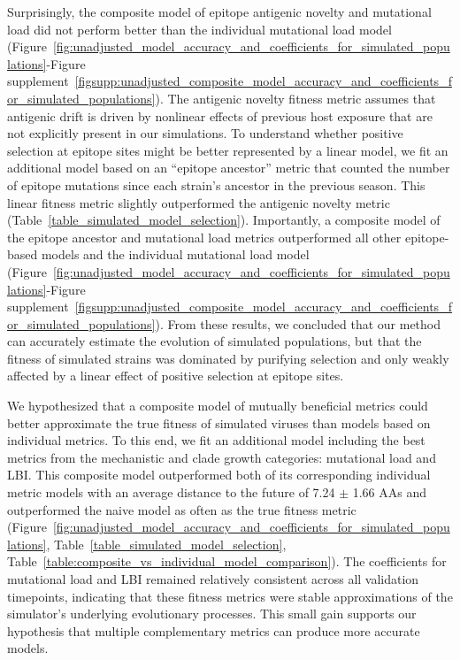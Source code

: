 Surprisingly, the composite model of epitope antigenic novelty and mutational load did not perform better than the individual mutational load model (Figure~\ref{fig:unadjusted_model_accuracy_and_coefficients_for_simulated_populations}-Figure supplement~\ref{figsupp:unadjusted_composite_model_accuracy_and_coefficients_for_simulated_populations}).
The antigenic novelty fitness metric assumes that antigenic drift is driven by nonlinear effects of previous host exposure \citep{Luksza:2014hj} that are not explicitly present in our simulations.
To understand whether positive selection at epitope sites might be better represented by a linear model, we fit an additional model based on an ``epitope ancestor'' metric that counted the number of epitope mutations since each strain's ancestor in the previous season.
This linear fitness metric slightly outperformed the antigenic novelty metric (Table~\ref{table_simulated_model_selection}).
Importantly, a composite model of the epitope ancestor and mutational load metrics outperformed all other epitope-based models and the individual mutational load model (Figure~\ref{fig:unadjusted_model_accuracy_and_coefficients_for_simulated_populations}-Figure supplement~\ref{figsupp:unadjusted_composite_model_accuracy_and_coefficients_for_simulated_populations}).
From these results, we concluded that our method can accurately estimate the evolution of simulated populations, but that the fitness of simulated strains was dominated by purifying selection and only weakly affected by a linear effect of positive selection at epitope sites.

We hypothesized that a composite model of mutually beneficial metrics could better approximate the true fitness of simulated viruses than models based on individual metrics.
To this end, we fit an additional model including the best metrics from the mechanistic and clade growth categories: mutational load and LBI.
This composite model outperformed both of its corresponding individual metric models with an average distance to the future of 7.24 $\pm$ 1.66 AAs and outperformed the naive model as often as the true fitness metric (Figure~\ref{fig:unadjusted_model_accuracy_and_coefficients_for_simulated_populations}, Table~\ref{table_simulated_model_selection}, Table~\ref{table:composite_vs_individual_model_comparison}).
The coefficients for mutational load and LBI remained relatively consistent across all validation timepoints, indicating that these fitness metrics were stable approximations of the simulator's underlying evolutionary processes.
This small gain supports our hypothesis that multiple complementary metrics can produce more accurate models.

